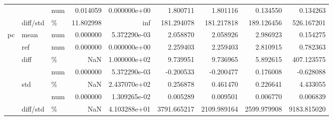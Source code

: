 \begin{tabular}{lllrrrrrr}
   &          & num &           0.014059 &       0.000000e+00 &           1.800711 &           1.801116 &          0.134550 &          0.134263 \\
   & diff/std & \% &          11.802998 &                inf &         181.294078 &         181.217818 &        189.126456 &        526.167201 \\
pc & mean & num &           0.000000 &       5.372290e-03 &           2.058870 &           2.058926 &          2.986923 &          0.154275 \\
   & ref & num &           0.000000 &       0.000000e+00 &           2.259403 &           2.259403 &          2.810915 &          0.782363 \\
   & diff & \% &                NaN &       1.000000e+02 &           9.739951 &           9.736965 &          5.892615 &        407.123575 \\
   &          & num &           0.000000 &       5.372290e-03 &          -0.200533 &          -0.200477 &          0.176008 &         -0.628088 \\
   & std & \% &                NaN &       2.437070e+02 &           0.256878 &           0.461470 &          0.226641 &          4.433055 \\
   &          & num &           0.000000 &       1.309265e-02 &           0.005289 &           0.009501 &          0.006770 &          0.006839 \\
   & diff/std & \% &                NaN &       4.103288e+01 &        3791.665217 &        2109.989164 &       2599.979908 &       9183.815020 \\
\bottomrule
\end{tabular}